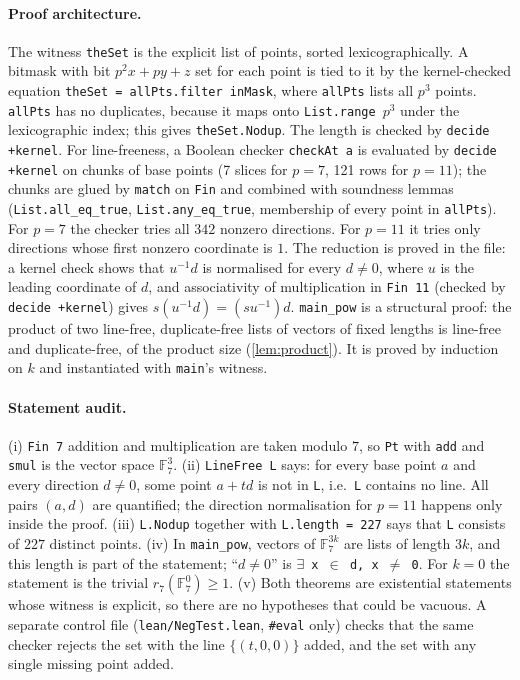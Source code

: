 \documentclass[11pt]{article}
\numberwithin{equation}{section}
\theoremstyle{definition}
\theoremstyle{remark}
\newcommand{\F}{\mathbb F}
\begin{document}
\paragraph{Proof architecture.} The witness \texttt{theSet} is the explicit list of points,
sorted lexicographically. A bitmask with bit $p^2x+py+z$ set for each point is tied to it by
the kernel-checked equation \texttt{theSet = allPts.filter inMask}, where \texttt{allPts}
lists all $p^3$ points. \texttt{allPts} has no duplicates, because it maps onto
\texttt{List.range}~$p^3$ under the lexicographic index; this gives \texttt{theSet.Nodup}.
The length is checked by \texttt{decide +kernel}. For line-freeness, a Boolean checker
\texttt{checkAt a} is evaluated by \texttt{decide +kernel} on chunks of base points (7 slices
for $p=7$, 121 rows for $p=11$); the chunks are glued by \texttt{match} on \texttt{Fin} and
combined with soundness lemmas (\texttt{List.all\_eq\_true}, \texttt{List.any\_eq\_true},
membership of every point in \texttt{allPts}). For $p=7$ the checker tries all $342$ nonzero
directions. For $p=11$ it tries only directions whose first nonzero coordinate is $1$. The
reduction is proved in the file: a kernel check shows that $u^{-1}d$ is normalised for every
$d\ne0$, where $u$ is the leading coordinate of $d$, and associativity of multiplication in
\texttt{Fin 11} (checked by \texttt{decide +kernel}) gives $s(u^{-1}d)=(su^{-1})d$.
\texttt{main\_pow} is a structural proof: the product of two line-free, duplicate-free lists of
vectors of fixed lengths is line-free and duplicate-free, of the product size
(\cref{lem:product}). It is proved by induction on $k$ and instantiated with \texttt{main}'s
witness.

\paragraph{Statement audit.}
(i) \texttt{Fin 7} addition and multiplication are taken modulo $7$, so \texttt{Pt} with
\texttt{add} and \texttt{smul} is the vector space $\F_7^3$.
(ii) \texttt{LineFree L} says: for every base point $a$ and every direction $d\neq0$, some
point $a+td$ is not in \texttt{L}, i.e.\ \texttt{L} contains no line. All pairs $(a,d)$ are
quantified; the direction normalisation for $p=11$ happens only inside the proof.
(iii) \texttt{L.Nodup} together with \texttt{L.length = 227} says that \texttt{L} consists of
$227$ distinct points.
(iv) In \texttt{main\_pow}, vectors of $\F_7^{3k}$ are lists of length $3k$, and this length is
part of the statement; ``$d\neq0$'' is \texttt{$\exists$ x $\in$ d, x $\neq$ 0}. For $k=0$ the
statement is the trivial $r_7(\F_7^0)\ge1$.
(v) Both theorems are existential statements whose witness is explicit, so there are no
hypotheses that could be vacuous. A separate control file
(\texttt{lean/NegTest.lean}, \texttt{\#eval} only) checks that the same checker rejects the set
with the line $\{(t,0,0)\}$ added, and the set with any single missing point added.
\end{document}
